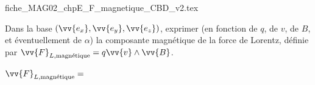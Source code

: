 
\finEntrainement






\hauteurLargeurCadreReponse		{8mm}{4.2cm}
\initialisationEntrainement


\begin{center}
{fiche_MAG02_chpE_F_magnetique_CBD_v2.tex}
\end{center}

Dans la base $\left(\vv{e_{x}},\vv{e_{y}},\vv{e_{z}}\right)$,
exprimer (en fonction de $q$, de $v$, de $B$, et éventuellement de $\alpha$) la composante magnétique de la force de Lorentz, définie par $\vv{F}_{L,\text{magnétique}}=q\vv{v}\land\vv{B}$.

\debutEntrainement


\begin{enonce}
$\vv{F}_{L,\text{magnétique}}=$
\end{enonce}

%



